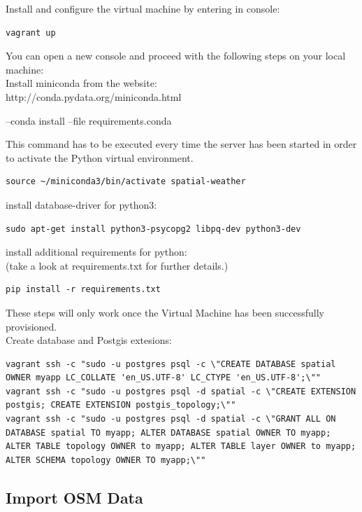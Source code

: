 \documentclass[paper=a4, fontsize=11pt]{scrartcl} %
\numberwithin{equation}{section} %
\numberwithin{figure}{section} %
\numberwithin{table}{section} %
\begin{document}
Install and configure the virtual machine by entering in console:
\begin{lstlisting}
vagrant up
\end{lstlisting}

You can open a new console and proceed with the following steps on your local machine:\\
Install miniconda from the website:\\
http://conda.pydata.org/miniconda.html

--conda install --file requirements.conda

This command has to be executed every time the server has been started in order to activate the Python virtual environment.
\begin{lstlisting}
source ~/miniconda3/bin/activate spatial-weather
\end{lstlisting}

install database-driver for python3:
\begin{lstlisting}
sudo apt-get install python3-psycopg2 libpq-dev python3-dev
\end{lstlisting}

install additional requirements for python:\\
(take a look at requirements.txt for further details.)
\begin{lstlisting}
pip install -r requirements.txt
\end{lstlisting}

These steps will only work once the Virtual Machine has been successfully provisioned.\\
Create database and Postgis extesions:
\begin{lstlisting}[breaklines=true]
vagrant ssh -c "sudo -u postgres psql -c \"CREATE DATABASE spatial OWNER myapp LC_COLLATE 'en_US.UTF-8' LC_CTYPE 'en_US.UTF-8';\"" 
vagrant ssh -c "sudo -u postgres psql -d spatial -c \"CREATE EXTENSION postgis; CREATE EXTENSION postgis_topology;\"" 
vagrant ssh -c "sudo -u postgres psql -d spatial -c \"GRANT ALL ON DATABASE spatial TO myapp; ALTER DATABASE spatial OWNER TO myapp; ALTER TABLE topology OWNER to myapp; ALTER TABLE layer OWNER to myapp; ALTER SCHEMA topology OWNER TO myapp;\""
\end{lstlisting}

\subsection{Import OSM Data}\label{import-osm-data}
\end{document}
